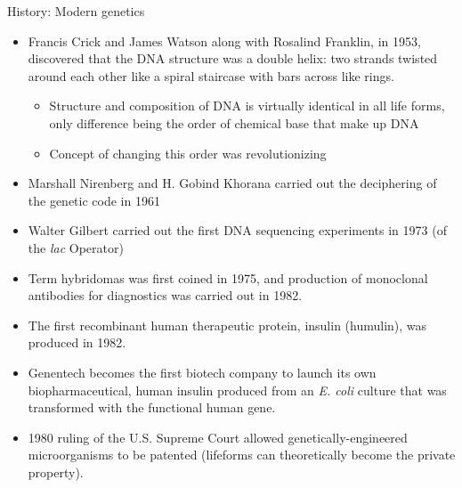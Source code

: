 \documentclass[
  ignorenonframetext,
  aspectratio=169]{beamer}
\providecommand{\tightlist}{%
  \setlength{\itemsep}{0pt}\setlength{\parskip}{0pt}}
\begin{document}
\begin{frame}{History: Modern genetics}
\protect\hypertarget{history-modern-genetics}{}
\scriptsize

\begin{itemize}
\tightlist
\item
  Francis Crick and James Watson along with Rosalind Franklin, in 1953,
  discovered that the DNA structure was a double helix: two strands
  twisted around each other like a spiral staircase with bars across
  like rings.

  \begin{itemize}
  \tightlist
  \item
    Structure and composition of DNA is virtually identical in all life
    forms, only difference being the order of chemical base that make up
    DNA
  \item
    Concept of changing this order was revolutionizing
  \end{itemize}
\item
  Marshall Nirenberg and H. Gobind Khorana carried out the deciphering
  of the genetic code in 1961
\item
  Walter Gilbert carried out the first DNA sequencing experiments in
  1973 (of the \textit{lac} Operator)
\item
  Term hybridomas was first coined in 1975, and production of monoclonal
  antibodies for diagnostics was carried out in 1982.
\item
  The first recombinant human therapeutic protein, insulin (humulin),
  was produced in 1982.
\item
  Genentech becomes the first biotech company to launch its own
  biopharmaceutical, human insulin produced from an \emph{E. coli}
  culture that was transformed with the functional human gene.
\item
  1980 ruling of the U.S. Supreme Court allowed genetically-engineered
  microorganisms to be patented (lifeforms can theoretically become the
  private property).
\end{itemize}
\end{frame}
\end{document}
